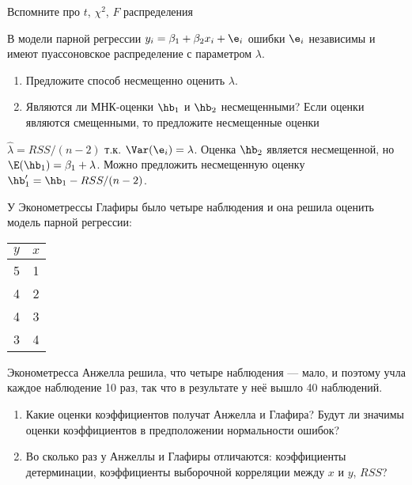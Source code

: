 \documentclass[pdftex,11pt,openany]{book}\usepackage[]{graphicx}\usepackage[]{color}
\begin{document}
\begin{solution}
Вспомните про $t$, $\chi^2$, $F$ распределения
\end{solution}


\begin{problem}
В модели парной регрессии $y_i=\beta_1+\beta_2 x_i +\e_i$ ошибки $\e_i$ независимы и имеют пуассоновское распределение с параметром $\lambda$.
\begin{enumerate}
\item Предложите способ несмещенно оценить $\lambda$.
\item Являются ли МНК-оценки $\hb_1$ и $\hb_2$ несмещенными? Если оценки являются смещенными, то предложите несмещенные оценки
\end{enumerate}
\end{problem}


\begin{solution}
$\hat{\lambda}=RSS/(n-2)$ т.к. $\Var(\e_i)=\lambda$. Оценка $\hb_2$ является несмещенной, но $\E(\hb_1)=\beta_1+\lambda$. Можно предложить несмещенную оценку $\hb'_1=\hb_1-RSS/(n-2)$.
\end{solution}



\begin{problem}
У Эконометрессы Глафиры было четыре наблюдения и она решила оценить модель парной регрессии:

\begin{tabular}{cc}
$y$ & $x$ \\
\hline
5 & 1 \\
4 & 2 \\
4 & 3 \\
3 & 4 \\
\end{tabular}

Эконометресса Анжелла решила, что четыре наблюдения --- мало, и поэтому учла каждое наблюдение 10 раз, так что в результате у неё вышло 40 наблюдений.

\begin{enumerate}
\item Какие оценки коэффициентов получат Анжелла и Глафира? Будут ли значимы оценки коэффициентов в предположении нормальности ошибок?
\item Во сколько раз у Анжеллы и Глафиры отличаются: коэффициенты детерминации, коэффициенты выборочной корреляции между $x$ и $y$, $RSS$?
\end{enumerate}

\end{problem}
\end{document}
